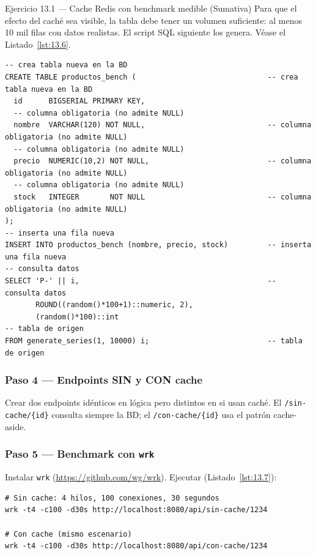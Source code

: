 \begin{cajaejercicio}{Ejercicio 13.1 --- Cache Redis con benchmark medible (Sumativa)}
Para que el efecto del caché sea visible, la tabla debe
tener un volumen suficiente: al menos 10 mil filas con datos
realistas. El script SQL siguiente los genera. V\'ease el Listado~\ref{lst:13.6}.


\begin{lstlisting}[style=sql,numbers=none,caption={Ejemplo de SQL},label=lst:13.6]
-- crea tabla nueva en la BD
CREATE TABLE productos_bench (                              -- crea tabla nueva en la BD
  id      BIGSERIAL PRIMARY KEY,
  -- columna obligatoria (no admite NULL)
  nombre  VARCHAR(120) NOT NULL,                            -- columna obligatoria (no admite NULL)
  -- columna obligatoria (no admite NULL)
  precio  NUMERIC(10,2) NOT NULL,                           -- columna obligatoria (no admite NULL)
  -- columna obligatoria (no admite NULL)
  stock   INTEGER       NOT NULL                            -- columna obligatoria (no admite NULL)
);
-- inserta una fila nueva
INSERT INTO productos_bench (nombre, precio, stock)         -- inserta una fila nueva
-- consulta datos
SELECT 'P-' || i,                                           -- consulta datos
       ROUND((random()*100+1)::numeric, 2),
       (random()*100)::int
-- tabla de origen
FROM generate_series(1, 10000) i;                           -- tabla de origen
\end{lstlisting}

\subsubsection*{Paso 4 --- Endpoints SIN y CON cache}

Crear dos endpoints idénticos en lógica pero distintos en si usan
caché. El \texttt{/sin-cache/\{id\}} consulta siempre la BD; el
\texttt{/con-cache/\{id\}} usa el patrón cache-aside.

\subsubsection*{Paso 5 --- Benchmark con \texttt{wrk}}

Instalar \texttt{wrk} (\url{https://github.com/wg/wrk}). Ejecutar (Listado~\ref{lst:13.7}):

\begin{lstlisting}[style=shell,numbers=none,caption={Ejemplo de Shell},label=lst:13.7]
# Sin cache: 4 hilos, 100 conexiones, 30 segundos
wrk -t4 -c100 -d30s http://localhost:8080/api/sin-cache/1234

# Con cache (mismo escenario)
wrk -t4 -c100 -d30s http://localhost:8080/api/con-cache/1234
\end{lstlisting}


\end{cajaejercicio}
